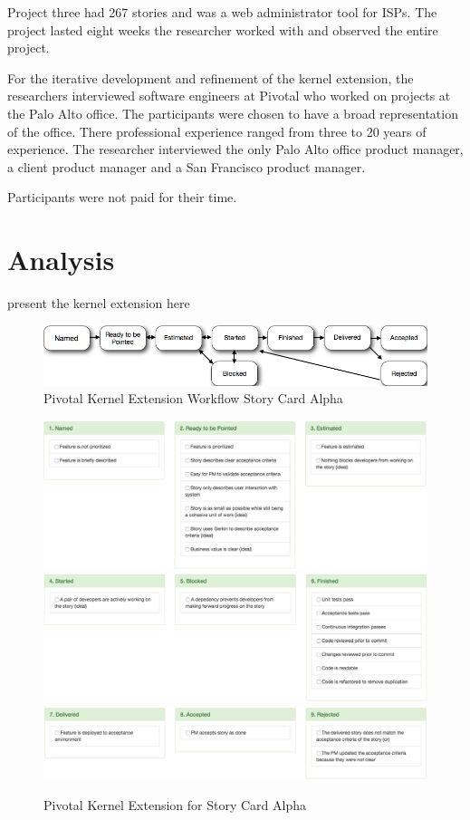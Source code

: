 \documentclass[preprint,12pt,3p]{elsarticle}
\begin{document}
Project three had 267 stories and was a web administrator tool for ISPs. The project lasted eight weeks the researcher worked with and observed the entire project.

For the iterative development and refinement of the kernel extension, the researchers interviewed software engineers at Pivotal who worked on projects at the Palo Alto office. The participants were chosen to have a broad representation of the office. There professional experience ranged from three to 20 years of experience. The researcher interviewed the only Palo Alto office product manager, a client product manager and a San Francisco product manager. 

Participants were not paid for their time. 

\section{Analysis}

present the kernel extension here
\begin{figure}[ht]
\includegraphics[width=6.25in]{pivotal_images/story_card_workflow}
\caption{Pivotal Kernel Extension Workflow Story Card Alpha}
\label{KernelExtensionWorkflow}
\end{figure}

\begin{figure}[ht]
\includegraphics[width=6.25in]{pivotal_images/story_card_prescriptive1}
\includegraphics[width=6.25in]{pivotal_images/story_card_prescriptive2}
\includegraphics[width=6.25in]{pivotal_images/story_card_prescriptive3}
\caption{Pivotal Kernel Extension for Story Card Alpha}
\label{KernelExtensionPrescriptive}
\end{figure}
\end{document}
